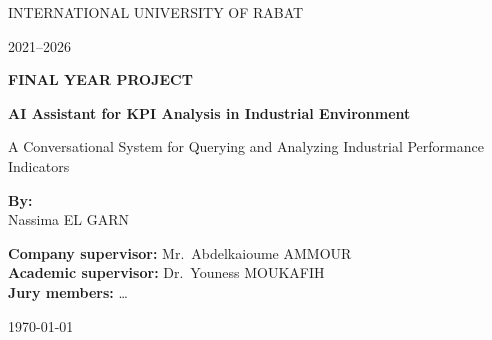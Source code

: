 \begin{titlepage}
\centering
\vspace*{1.5cm}
{\Large INTERNATIONAL UNIVERSITY OF RABAT\par}
\vspace{0.5cm}
{\large 2021--2026\par}
\vspace{2cm}
{\LARGE\bfseries FINAL YEAR PROJECT\par}
\vspace{1.5cm}
{\Large\bfseries AI Assistant for KPI Analysis in Industrial Environment\par}
\vspace{0.6cm}
{\large A Conversational System for Querying and Analyzing Industrial Performance Indicators\par}
\vfill
{\large\textbf{By:}\\[0.3cm]
Nassima EL GARN\par}
\vspace{1.2cm}
\begin{minipage}{0.9\textwidth}
\centering
\textbf{Company supervisor:} Mr.\ Abdelkaioume AMMOUR\\[0.4cm]
\textbf{Academic supervisor:} Dr.\ Youness MOUKAFIH\\[0.4cm]
\textbf{Jury members:} \ldots
\end{minipage}
\vfill
{\large \today\par}
\end{titlepage}
